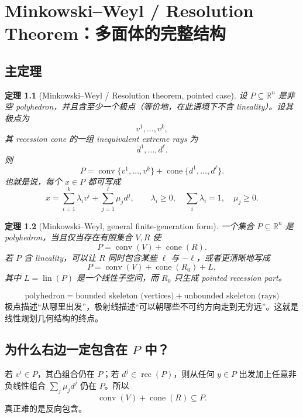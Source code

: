 \documentclass[11pt,a4paper,openany]{ctexrep}
\newtheorem{theorem}{定理}[chapter]
\theoremstyle{definition}
\newcommand{\R}{\mathbb{R}}
\newcommand{\conv}{\operatorname{conv}}
\newcommand{\cone}{\operatorname{cone}}
\newcommand{\rec}{\operatorname{rec}}
\newcommand{\lin}{\operatorname{lin}}
\begin{document}
\chapter{Minkowski--Weyl / Resolution Theorem：多面体的完整结构}

\section{主定理}

\begin{theorem}[Minkowski--Weyl / Resolution theorem, pointed case]
设 $P\subseteq\R^n$ 是非空 polyhedron，并且含至少一个极点（等价地，在此语境下不含 lineality）。设其极点为
\[
v^1,\dots,v^k,
\]
其 recession cone 的一组 inequivalent extreme rays 为
\[
d^1,\dots,d^\ell.
\]
则
\begin{equation}
P=
\conv\{v^1,\dots,v^k\}
+
\cone\{d^1,\dots,d^\ell\}.
\label{eq:minkowski-weyl}
\end{equation}
也就是说，每个 $x\in P$ 都可写成
\[
x=\sum_{i=1}^k\lambda_i v^i+
\sum_{j=1}^{\ell}\mu_j d^j,
\qquad
\lambda_i\ge0,\quad
\sum_i\lambda_i=1,\quad
\mu_j\ge0.
\]
\end{theorem}

\begin{theorem}[Minkowski--Weyl, general finite-generation form]
一个集合 $P\subseteq\R^n$ 是 polyhedron，当且仅当存在有限集合 $V,R$ 使
\[
P=\conv(V)+\cone(R).
\]
若 $P$ 含 lineality，可以让 $R$ 同时包含某些 $\ell$ 与 $-\ell$，或者更清晰地写成
\[
P=\conv(V)+\cone(R_0)+L,
\]
其中 $L=\lin(P)$ 是一个线性子空间，而 $R_0$ 只生成 pointed recession part。
\end{theorem}

\begin{keybox}[一句话解释]
\[
\boxed{\text{polyhedron} = \text{bounded skeleton (vertices)} + \text{unbounded skeleton (rays)}}
\]
极点描述“从哪里出发”，极射线描述“可以朝哪些不可约方向走到无穷远”。这就是线性规划几何结构的终点。
\end{keybox}

\section{为什么右边一定包含在 $P$ 中？}
若 $v^i\in P$，其凸组合仍在 $P$；若 $d^j\in\rec(P)$，则从任何 $y\in P$ 出发加上任意非负线性组合 $\sum_j\mu_jd^j$ 仍在 $P$。所以
\[
\conv(V)+\cone(R)\subseteq P.
\]
真正难的是反向包含。
\end{document}
